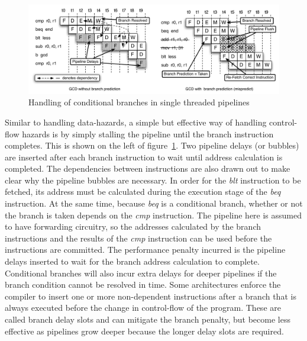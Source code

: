 \begin{figure}
\begin{center}
\includegraphics[scale=.58]{figs/branch_execution_non_interleaved_pipeline}
\end{center}
\vspace{-10pt}
\caption{Handling of conditional branches in single threaded pipelines}
\label{fig:branch_execution_non_interleaved_pipeline}
\end{figure}
Similar to handling data-hazards, a simple but effective way of handling control-flow hazards is by simply stalling the pipeline until the branch instruction completes.
This is shown on the left of figure~\ref{fig:branch_execution_non_interleaved_pipeline}. 
Two pipeline delays (or bubbles) are inserted after each branch instruction to wait until address calculation is completed.
The dependencies between instructions are also drawn out to make clear why the pipeline bubbles are necessary.
In order for the \emph{blt} instruction to be fetched, its address must be calculated during the execution stage of the \emph{beq} instruction.
At the same time, because \emph{beq} is a conditional branch, whether or not the branch is taken depends on the \emph{cmp} instruction.
The pipeline here is assumed to have forwarding circuitry, so the addresses calculated by the branch instructions and the results of the \emph{cmp} instruction can be used before the instructions are committed.
The performance penalty incurred is the pipeline delays inserted to wait for the branch address calculation to complete.
Conditional branches will also incur extra delays for deeper pipelines if the branch condition cannot be resolved in time. 
Some architectures enforce the compiler to insert one or more non-dependent instructions after a branch that is always executed before the change in control-flow of the program. 
These are called branch delay slots and can mitigate the branch penalty, but become less effective as pipelines grow deeper because the longer delay slots are required.  

